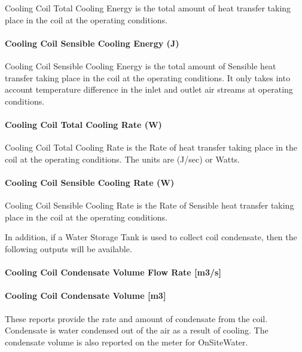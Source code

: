 Cooling Coil Total Cooling Energy is the total amount of heat transfer taking place in the coil at the operating conditions.

\paragraph{Cooling Coil Sensible Cooling Energy (J)}\label{cooling-coil-sensible-cooling-energy-j-3}

Cooling Coil Sensible Cooling Energy is the total amount of Sensible heat transfer taking place in the coil at the operating conditions. It only takes into account temperature difference in the inlet and outlet air streams at operating conditions.

\paragraph{Cooling Coil Total Cooling Rate (W)}\label{cooling-coil-total-cooling-rate-w-3}

Cooling Coil Total Cooling Rate is the Rate of heat transfer taking place in the coil at the operating conditions. The units are (J/sec) or Watts.

\paragraph{Cooling Coil Sensible Cooling Rate (W)}\label{cooling-coil-sensible-cooling-rate-w-3}

Cooling Coil Sensible Cooling Rate is the Rate of Sensible heat transfer taking place in the coil at the operating conditions.

In addition, if a Water Storage Tank is used to collect coil condensate, then the following outputs will be available.

\paragraph{Cooling Coil Condensate Volume Flow Rate {[}m3/s{]}}\label{cooling-coil-condensate-volume-flow-rate-m3s-3}

\paragraph{Cooling Coil Condensate Volume {[}m3{]}}\label{cooling-coil-condensate-volume-m3-3}

These reports provide the rate and amount of condensate from the coil. Condensate is water condensed out of the air as a result of cooling. The condensate volume is also reported on the meter for OnSiteWater.

